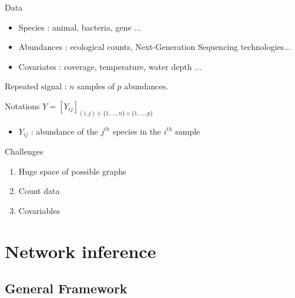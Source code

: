 \documentclass{beamer}
\newcommand{\emphase}[1]{\textcolor{Complement}{#1}}
\begin{document}
\begin{frame}{Data}
	\begin{itemize}
	\item \emphase{Species} : animal, bacteria, gene ...
	\item \emphase{Abundances} : ecological counts, Next-Generation Sequencing technologies...
	\item \emphase{Covariates} : coverage, temperature, water depth ... 
\end{itemize}
	Repeated signal : $n$ samples of $p$ abundances.
\begin{block}{Notations}
	$Y = [Y_{ij}]_{(i,j) \in \{1,...,n\} \times \{1,..., p\}} $
	\begin{itemize}
	\item $Y_{ij}$ : abundance of the $j^{th}$ species in the $i^{th}$ sample
\end{itemize}
\end{block}
\begin{center}
	\color{Nicered}{Infer the species interaction network from $Y$}
\end{center}
\end{frame}
\begin{frame}{Challenges}
	\begin{enumerate}
	\item  Huge space of possible graphs
	\item Count data
	\item Covariables
\end{enumerate}
\end{frame}

\section{Network inference}
\subsection{General Framework}
\end{document}
